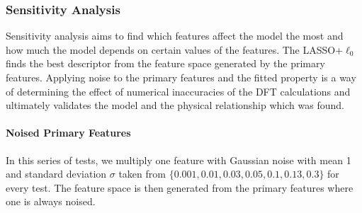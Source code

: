 \documentclass[11pt,oneside,czech,american]{book} %
\theoremstyle{definition} %
\theoremstyle{definition}
\begin{document}
\subsubsection{Sensitivity Analysis}
Sensitivity analysis aims to find which features affect the model the most and how much the model depends on certain values of the features. The LASSO+$\ell_{0}$ finds the best descriptor from the feature space generated by the primary features. Applying noise to the primary features and the fitted property is a way of determining the effect of numerical inaccuracies of the DFT calculations and ultimately validates the model and the physical relationship which was found.
\paragraph{Noised Primary Features}
In this series of tests, we multiply one feature with Gaussian noise with mean 1 and standard deviation $\sigma$ taken from $\{0.001, 0.01, 0.03, 0.05, 0.1, 0.13, 0.3\}$ for every test. The feature space is then generated from the primary features where one is always noised.
\end{document}
